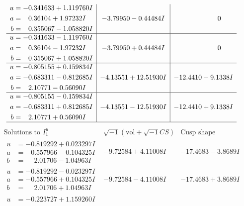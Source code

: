 \documentclass[1p]{elsarticle_modified}
\theoremstyle{definition}
\newcommand{\I}{\sqrt{-1}}
\begin{document}
$$\begin{array}{c|c|c}
\begin{aligned}
u &= -0.341633 + 1.119760 I \\
a &= \phantom{-}0.36104 + 1.97232 I \\
b &= \phantom{-}0.355067 - 1.058820 I\end{aligned}
 & -3.79950 - 0.44484 I & \phantom{-0.000000 } 0 \\ \hline\begin{aligned}
u &= -0.341633 - 1.119760 I \\
a &= \phantom{-}0.36104 - 1.97232 I \\
b &= \phantom{-}0.355067 + 1.058820 I\end{aligned}
 & -3.79950 + 0.44484 I & \phantom{-0.000000 } 0 \\ \hline\begin{aligned}
u &= -0.805155 + 0.159834 I \\
a &= -0.683311 - 0.812685 I \\
b &= \phantom{-}2.10771 - 0.56090 I\end{aligned}
 & -4.13551 + 12.51930 I & -12.4410 - 9.1338 I \\ \hline\begin{aligned}
u &= -0.805155 - 0.159834 I \\
a &= -0.683311 + 0.812685 I \\
b &= \phantom{-}2.10771 + 0.56090 I\end{aligned}
 & -4.13551 - 12.51930 I & -12.4410 + 9.1338 I\\
 \hline 
 \end{array}$$\newpage$$\begin{array}{c|c|c}  
\text{Solutions to }I^u_{1}& \I (\text{vol} + \sqrt{-1}CS) & \text{Cusp shape}\\
 \hline 
\begin{aligned}
u &= -0.819292 + 0.023297 I \\
a &= -0.557966 - 0.104325 I \\
b &= \phantom{-}2.01706 - 1.04963 I\end{aligned}
 & -9.72584 + 4.11008 I & -17.4683 - 3.8689 I \\ \hline\begin{aligned}
u &= -0.819292 - 0.023297 I \\
a &= -0.557966 + 0.104325 I \\
b &= \phantom{-}2.01706 + 1.04963 I\end{aligned}
 & -9.72584 - 4.11008 I & -17.4683 + 3.8689 I \\ \hline\begin{aligned}
u &= -0.223727 + 1.159260 I \\

\end{aligned}
\end{array}$$
\end{document}
